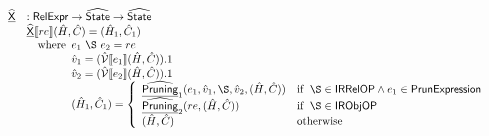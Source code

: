 \[\begin{array}{ll}
\ahf{X} & : \SF{RelExpr} \rightarrow \aState \rightarrow \aState\\
& \ahf{X} \lbr re \rbr (\hat{H}, \hat{C}) = (\hat{H}_1, \hat{C}_1)\\
& \quad\wherec{
  e_1 ~ \rel ~ e_2 = re\\
  \hat{v}_1 = (\aV \lbr e_1 \rbr (\hat{H}, \hat{C})).1\\
  \hat{v}_2 = (\aV \lbr e_2 \rbr (\hat{H}, \hat{C})).1\\
  (\hat{H}_1, \hat{C}_1) = 
    \left\{ 
      \begin{array}{ll}
        \ahf {Pruning}_1 (e_1, \hat{v}_1, \rel, \hat{v}_2, (\hat{H}, \hat{C})) & 
          \ifc{\rel \in \SF{IRRelOP} \land e_1 \in \SF{PrunExpression}}\\
        \ahf {Pruning}_2 ( re, (\hat{H}, \hat{C})) & 
          \ifc{\rel \in \SF{IRObjOP}}\\
        (\hat{H}, \hat{C}) & \owc\\
      \end{array}
    \right.\\
}\\
\\\\
%

\end{array}\]
